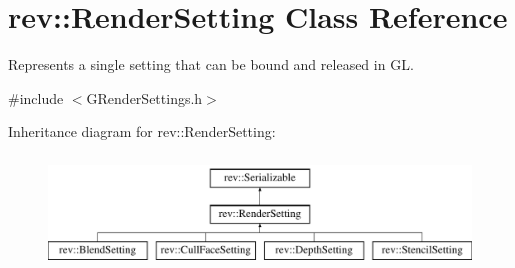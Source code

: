 \hypertarget{classrev_1_1_render_setting}{}\section{rev\+::Render\+Setting Class Reference}
\label{classrev_1_1_render_setting}


Represents a single setting that can be bound and released in GL.  




{\ttfamily \#include $<$G\+Render\+Settings.\+h$>$}

Inheritance diagram for rev\+::Render\+Setting\+:\begin{figure}[H]
\begin{center}
\leavevmode
\includegraphics[height=3.000000cm]{classrev_1_1_render_setting}
\end{center}
\end{figure}
